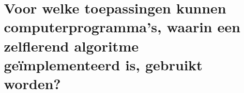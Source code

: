 \section{Voor welke toepassingen kunnen computerprogramma's, waarin een zelflerend algoritme ge\"implementeerd is, gebruikt worden?}
